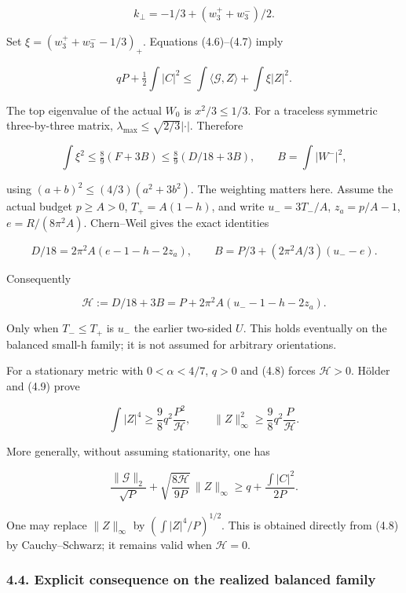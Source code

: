 \documentclass[
  10pt,
]{article}
\begin{document}
\[
 k_\perp=-1/3+(w_3^++w_3^-)/2.
\]

Set \(\xi=(w_3^++w_3^--1/3)_+\). Equations (4.6)--(4.7) imply

\[
 qP+\tfrac12\int|C|^2
             \le\int\langle\mathcal G,Z\rangle+\int\xi|Z|^2.
                                                        \tag{4.8}
\]

The top eigenvalue of the actual \(W_0\) is \(x^2/3\le1/3\). For a
traceless symmetric three-by-three matrix,
\(\lambda_{\max}\le\sqrt{2/3}|\cdot|\). Therefore

\[
 \int\xi^2\le\tfrac89(F+3B)
            \le\tfrac89(D/18+3B),\qquad B=\int|W^-|^2,          \tag{4.9}
\]

using \((a+b)^2\le(4/3)(a^2+3b^2)\). The weighting matters here. Assume
the actual budget \(p\ge A>0\), \(T_+=A(1-h)\), and write
\(u_-=3T_-/A\), \(z_a=p/A-1\), \(e=R/(8\pi^2A)\). Chern--Weil gives the
exact identities

\[
 D/18=2\pi^2A(e-1-h-2z_a),\qquad
 B=P/3+(2\pi^2A/3)(u_--e).
\]

Consequently

\[
 \boxed{\mathcal H:=D/18+3B
             =P+2\pi^2A(u_--1-h-2z_a).}             \tag{4.10}
\]

Only when \(T_-\le T_+\) is \(u_-\) the earlier two-sided \(U\). This
holds eventually on the balanced small-h family; it is not assumed for
arbitrary orientations.

For a stationary metric with \(0<\alpha<4/7\), \(q>0\) and (4.8) forces
\(\mathcal H>0\). Hölder and (4.9) prove

\[
 \boxed{\int|Z|^4\ge\frac98q^2\frac{P^2}{\mathcal H},
 \qquad \|Z\|_\infty^2\ge\frac98q^2\frac P{\mathcal H}.}       \tag{4.11}
\]

More generally, without assuming stationarity, one has

\[
 \boxed{
 \frac{\|\mathcal G\|_2}{\sqrt P}
       +\sqrt{\frac{8\mathcal H}{9P}}\,\|Z\|_\infty
               \ge q+\frac{\int|C|^2}{2P}.}         \tag{4.12}
\]

One may replace \(\|Z\|_\infty\) by \((\int|Z|^4/P)^{1/2}\). This is
obtained directly from (4.8) by Cauchy--Schwarz; it remains valid when
\(\mathcal H=0\).

\hypertarget{explicit-consequence-on-the-realized-balanced-family}{%
\subsubsection{4.4. Explicit consequence on the realized balanced
family}\label{explicit-consequence-on-the-realized-balanced-family}}
\end{document}
